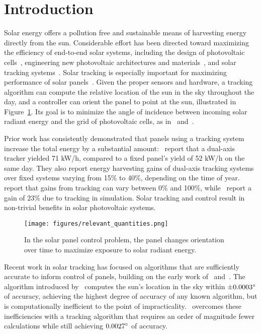 \documentclass{article}
\begin{document}
\section{Introduction}
Solar energy offers a pollution free and sustainable means of harvesting energy directly from the sun. Considerable effort has been directed toward maximizing the efficiency of end-to-end solar systems, including the design of photovoltaic cells~\cite{Jervase2001,li2012molecular}, engineering new photovoltaic architectures and materials~\cite{li2005high}, and solar tracking systems~\cite{camacho2012control}. Solar tracking is especially important for maximizing performance of solar panels~\cite{Eke2012,Rizk2008,King2001}. Given the proper sensors and hardware, a tracking algorithm can compute the relative location of the sun in the sky throughout the day, and a controller can orient the panel to point at the sun, illustrated in Figure~\ref{fig:solar}. Its goal is to minimize the angle of incidence between incoming solar radiant energy and the grid of photovoltaic cells, as in~\citet{Eke2012,Benghanem2011,King2001} and~\citet{kalogirou1996design}.

Prior work has consistently demonstrated that panels using a tracking system increase the total energy by a substantial amount:~\citet{Eke2012} report that a dual-axis tracker yielded 71 kW/h, compared to a fixed panel's yield of 52 kW/h on the same day. They also report energy harvesting gains of dual-axis tracking systems over fixed systems varying from 15\% to 40\%, depending on the time of year.~\citet{mousazadeh2009review} report that gains from tracking can vary between 0\% and 100\%, while~\citet{clifford2004design} report a gain of $23\%$ due to tracking in simulation. Solar tracking and control result in non-trivial benefits in solar photovoltaic systems.

\begin{figure}[b!]
\begin{center}
\texttt{[image: figures/relevant\_quantities.png]}
\caption{In the solar panel control problem, the panel changes orientation over time to maximize exposure to solar radiant energy.}
\label{fig:solar}
\end{center}
\end{figure}

Recent work in solar tracking has focused on algorithms that are sufficiently accurate to inform control of panels, building on the early work of~\citet{spencer1971fourier,walraven1978calculating} and~\citet{michalsky1988astronomical}. The algorithm introduced by~\citet{reda2004solar} computes the sun's location in the sky within $\pm 0.0003\degree$ of accuracy, achieving the highest degree of accuracy of any known algorithm, but is computationally inefficient to the point of impracticality.~\citet{Grena2008} overcomes these inefficiencies with a tracking algorithm that requires an order of magnitude fewer calculations while still achieving $0.0027\degree$ of accuracy.
\end{document}
